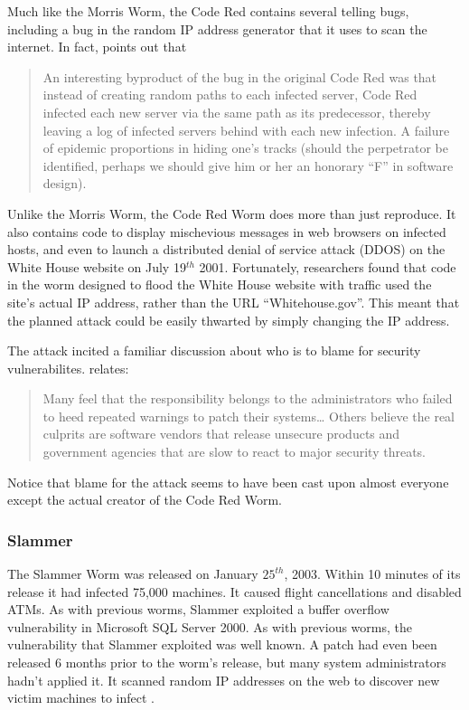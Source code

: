 Much like the Morris Worm, the Code Red contains several telling bugs, including
a bug in the random IP address generator that it uses to scan the internet. In
fact, \cite{berghel_code_2001} points out that
\begin{quote}
An interesting byproduct of the bug in the original Code Red was that instead 
of creating random paths to each infected server, Code Red infected each new
server via the same path as its predecessor, thereby leaving a log of infected
servers behind with each new infection. A failure of epidemic proportions in
hiding one's tracks (should the perpetrator be identified, perhaps we should
give him or her an honorary ``F'' in software design).
\end{quote}

Unlike the Morris Worm, the Code Red Worm does more than just reproduce. It also
contains code to display mischevious messages in web browsers on infected hosts,
and even to launch a distributed denial of service attack (DDOS) on the White
House website on July 19$^{th}$ 2001. Fortunately, researchers found that code
in the worm designed to flood the White House website with traffic used the
site's actual IP address, rather than the URL ``Whitehouse.gov''. This meant
that the planned attack could be easily thwarted by simply changing the IP
address\cite{berghel_code_2001}.

The attack incited a familiar discussion about who is to blame for security
vulnerabilites. \cite{berghel_code_2001} relates:
\begin{quote}
Many feel that the responsibility belongs to the administrators who failed to
heed repeated warnings to patch their systems\ldots
Others believe the real culprits are software vendors that release unsecure
products and government agencies that are slow to react to major security threats.
\end{quote}

Notice that blame for the attack seems to have been cast upon almost everyone
except the actual creator of the Code Red Worm.

\subsubsection*{Slammer}
The Slammer Worm was released on January $25^{th}$, 2003. Within 10 minutes of
its release it had infected 75,000 machines. It caused
flight cancellations and disabled ATMs. As with previous worms, Slammer
exploited a buffer overflow vulnerability in Microsoft SQL Server 2000. As with
previous worms, the vulnerability that Slammer exploited was well known. A
patch had even been released 6 months prior to the worm's release, but many
system administrators hadn't applied it. It scanned random IP addresses on the
web to discover new victim machines to infect
\cite{tynan_dawn_2003}\cite{panko_slammer:_2003}.


